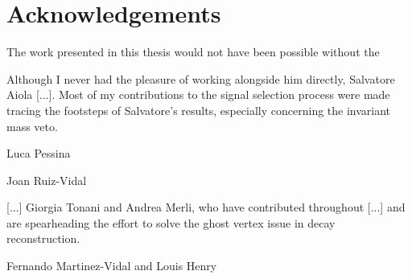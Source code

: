 \chapter*{Acknowledgements}

The work presented in this thesis would not have been possible without the

Although I never had the pleasure of working alongside him directly, Salvatore Aiola [...].
Most of my contributions to the signal selection process were made tracing the footsteps of Salvatore's results, especially concerning the \bz invariant mass veto.

Luca Pessina

Joan Ruiz-Vidal

[...] Giorgia Tonani and Andrea Merli, who have contributed throughout [...] and are spearheading the effort to solve the ghost vertex issue in \lambdadecay decay reconstruction.

Fernando Martinez-Vidal and Louis Henry